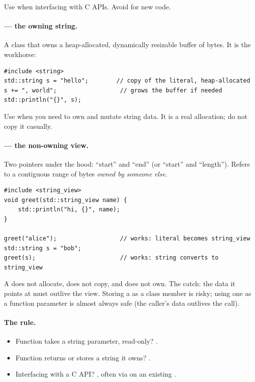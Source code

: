 Use  when interfacing with C APIs. Avoid for new
\cpp{} code.

\paragraph{ --- the owning string.}
A class that owns a heap-allocated, dynamically resizable buffer of
bytes. It is the workhorse:

\begin{lstlisting}
#include <string>
std::string s = "hello";        // copy of the literal, heap-allocated
s += ", world";                  // grows the buffer if needed
std::println("{}", s);
\end{lstlisting}

Use  when you need to own and mutate string data.
It is a real allocation; do not copy it casually.

\paragraph{ --- the non-owning view.}
Two pointers under the hood: ``start'' and ``end'' (or ``start'' and
``length''). Refers to a contiguous range of bytes \emph{owned by
someone else}.

\begin{lstlisting}
#include <string_view>
void greet(std::string_view name) {
    std::println("hi, {}", name);
}

greet("alice");                  // works: literal becomes string_view
std::string s = "bob";
greet(s);                        // works: string converts to string_view
\end{lstlisting}

A  does not allocate, does not copy, and does not
own. The catch: the data it points at must outlive the view. Storing
a  as a class member is risky; using one as a
function parameter is almost always safe (the caller's data outlives
the call).

\paragraph{The rule.}
\begin{itemize}[leftmargin=*]
  \item Function takes a string parameter, read-only?
    .
  \item Function returns or stores a string it owns?
    .
  \item Interfacing with a C API? , often via
     on an existing .
\end{itemize}

